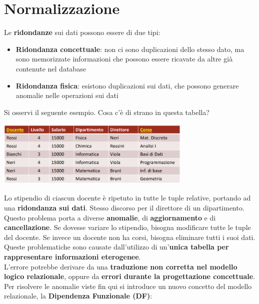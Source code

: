 \documentclass{article}
\begin{document}
\pagestyle{empty}

\section*{Normalizzazione} 
\large

Le \textbf{ridondanze} sui dati possono essere di due tipi:
\begin{itemize}[label={-}, leftmargin=1cm]
    \itemsep0em
    \item \textbf{Ridondanza concettuale}: non ci sono duplicazioni dello stesso dato, ma sono memorizzate informazioni che possono essere ricavate da altre già contenute nel database
    \item \textbf{Ridondanza fisica}: esistono duplicazioni sui dati, che possono generare anomalie nelle operazioni sui dati
\end{itemize}
Si osservi il seguente esempio. Cosa c'è di strano in questa tabella?
\begin{center}
    \includegraphics[width=0.7\textwidth]{foto1.png}
\end{center}
Lo stipendio di ciascun docente è ripetuto in tutte le tuple relative, portando ad una \textbf{ridondanza sui dati}. Stesso discorso per il direttore di un dipartimento.\\
Questo problema porta a diverse \textbf{anomalie}, di \textbf{aggiornamento} e di \textbf{cancellazione}. Se dovesse variare lo stipendio, bisogna modificare tutte le tuple del docente. Se invece un docente non ha corsi, bisogna eliminare tutti i suoi dati.\vspace{14pt}\\
Queste problematiche sono causate dall'utilizzo di un'\textbf{unica tabella per rappresentare informazioni eterogenee}.\\
L'errore potrebbe derivare da una \textbf{traduzione non corretta nel modello logico relazionale}, oppure da \textbf{errori durante la progettazione concettuale}.\vspace{14pt}\\
Per risolvere le anomalie viste fin qui si introduce un nuovo concetto del modello relazionale, la \textbf{Dipendenza Funzionale (DF)}:\vspace{14pt}\\
\end{document}
